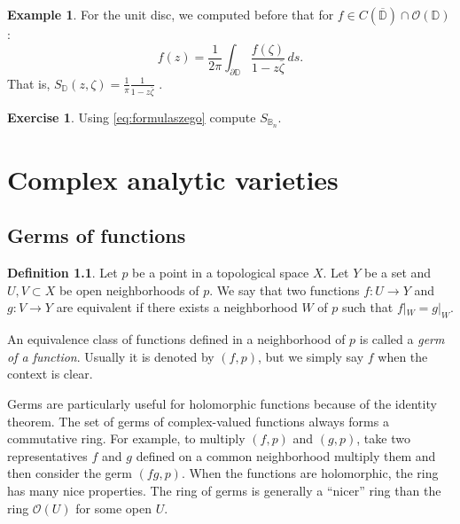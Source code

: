 \documentclass[12pt,openany]{book}
\newcommand{\D}{{\mathbb{D}}}
\newcommand{\bB}{{\mathbb{B}}}
\newcommand{\sO}{{\mathscr{O}}}
\newcommand{\myindex}[1]{#1\index{#1}}
\theoremstyle{plain}
\theoremstyle{remark}
\theoremstyle{definition}
\newtheorem{defn}[thm]{Definition}
\newenvironment{exbox}{%
    \def\FrameCommand{\vrule width 1pt \relax\hspace {10pt}}%
    \MakeFramed {\advance \hsize -\width \FrameRestore }%
}{%
    \endMakeFramed
}
\theoremstyle{exercise}
\newtheorem{exercise}{Exercise}[section]
\theoremstyle{example}
\newtheorem{example}[thm]{Example}
\begin{document}
\begin{example}
For the unit disc,
we computed before that for $f \in C(\overline{\D}) \cap \sO(\D)$:
\begin{equation*}
f(z) = \frac{1}{2\pi} \int_{\partial \D} \frac{f(\zeta)}{1-z\bar{\zeta}} \, ds .
\end{equation*}
That is, $S_{\D}(z,\zeta) = 
\frac{1}{\pi}
\frac{1}{1-z\bar{\zeta}}$ .
\end{example}

\begin{exbox}
\begin{exercise}
Using \eqref{eq:formulaszego} compute $S_{\bB_n}$.
\end{exercise}
\end{exbox}


\chapter{Complex analytic varieties} \label{ch:analyticvarieties}


\section{Germs of functions}

\begin{defn}
Let $p$ be a point in a topological space $X$.  Let $Y$ be a set and
$U, V \subset X$ be open neighborhoods of $p$.  We say that
two functions $f \colon U \to Y$ and
$g \colon V \to Y$ are equivalent if there exists a neighborhood
$W$ of $p$ such that $f|_W = g|_W$.

An equivalence class of functions defined in a neighborhood of $p$
is called a \emph{\myindex{germ of a function}}.
%
Usually it is denoted by $(f,p)$, but we simply say $f$ when
the context is clear.
\end{defn}

Germs are particularly useful for holomorphic functions because of the identity
theorem.  The set of germs of complex-valued functions always forms a
commutative ring.
For example, to multiply $(f,p)$ and $(g,p)$, take two representatives
$f$ and $g$ defined on a common neighborhood multiply them and
then consider the germ $(fg,p)$.
When the functions are holomorphic, the ring has many nice properties.
The ring of germs is generally a ``nicer'' ring than the ring $\sO(U)$ for
some open $U$.
\end{document}

